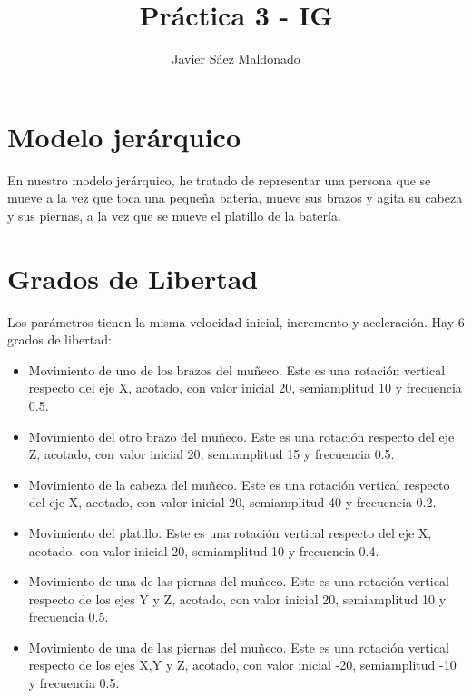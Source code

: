 \documentclass[11pt]{article}
\title{\textbf{Práctica 3 - IG}}
\author{Javier Sáez Maldonado}
\date{}
\begin{document}
\maketitle

\section{Modelo jerárquico}

En nuestro modelo jerárquico, he tratado de representar una persona que se mueve a la vez que toca una pequeña batería, mueve sus brazos y agita su cabeza y sus piernas, a la vez que se mueve el platillo de la batería.

\section{Grados de Libertad}
Los parámetros tienen la misma velocidad inicial, incremento y aceleración. Hay 6 grados de libertad:
\begin{itemize}
	\item Movimiento de uno de los brazos del muñeco. Este es una rotación vertical respecto del eje X, acotado, con valor inicial 20, semiamplitud 10 y frecuencia 0.5.
	\item Movimiento del otro brazo del muñeco. Este es una rotación  respecto del eje Z, acotado, con valor inicial 20, semiamplitud 15 y frecuencia 0.5.
	\item Movimiento de la cabeza del muñeco. Este es una rotación vertical respecto del eje X, acotado, con valor inicial 20, semiamplitud 40 y frecuencia 0.2.
	\item Movimiento del platillo. Este es una rotación vertical respecto del eje X, acotado, con valor inicial 20, semiamplitud 10 y frecuencia 0.4.
	\item Movimiento de una de las piernas del muñeco. Este es una rotación vertical respecto de los ejes Y y Z, acotado, con valor inicial 20, semiamplitud 10 y frecuencia 0.5.
	\item Movimiento de una de las piernas del muñeco. Este es una rotación vertical respecto de los ejes X,Y y Z, acotado, con valor inicial -20, semiamplitud -10 y frecuencia 0.5.
\end{itemize}
\end{document}
